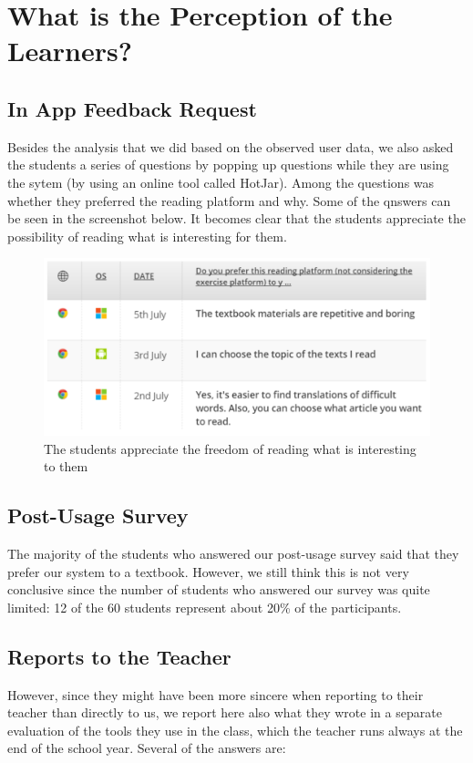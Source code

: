 
\newpage
\section{What is the Perception of the Learners?}

\subsection{In App Feedback Request}
Besides the analysis that we did based on the observed user data, we also asked the students a series of questions by popping up questions while they are using the sytem (by using an online tool called HotJar). Among the questions was whether they preferred the reading platform and why. Some of the qnswers can be seen in the screenshot below. It becomes clear that the students appreciate the possibility of reading what is interesting for them.

    \begin{figure}[h!]
    \centering
      \includegraphics[width=0.9\columnwidth]{figures/opinion_on_reading_platform}
      \caption{The students appreciate the freedom of reading what is interesting to them }
    \end{figure}

\subsection{Post-Usage Survey}

The majority of the students who answered our post-usage survey said that  they prefer our system to a textbook. However, we still think this is not very conclusive since the number of students who answered our survey was quite limited: 12 of the 60 students represent about 20\% of the participants. 


\subsection{Reports to the Teacher}
However, since they might have been more sincere when reporting to their teacher than directly to us, we report here also what they wrote in a separate evaluation of the tools they use in the class, which the teacher runs always at the end of the school year. Several of the answers are: 

